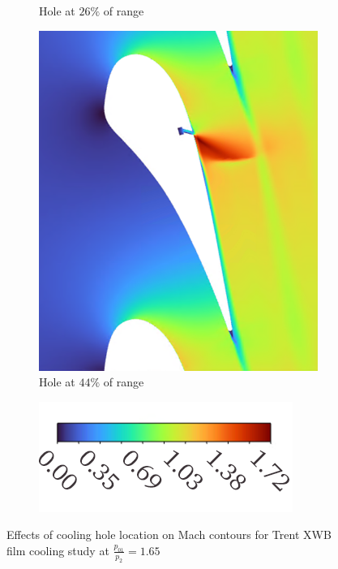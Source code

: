 \documentclass[a4paper, 11pt, oneside]{report}
\begin{document}
\begin{figure}[H]
\begin{subfigure}{.42\textwidth}
		\caption{Hole at $26\%$ of range}
	\end{subfigure}
	\hspace{0.05\textwidth}
	\begin{subfigure}{.42\textwidth}
		\centering
		\includegraphics[width=\linewidth]{figs/sch_mach_contours_3.png}
		\caption{Hole at $44\%$ of range}
	\end{subfigure}
	\begin{subfigure}{.4\textwidth}
		\centering
		\includegraphics[width=\linewidth]{figs/mach_legend_choked_horizontal.png}
	\end{subfigure}
	\caption{Effects of cooling hole location on Mach contours for Trent XWB film cooling study at $\frac{p_{01}}{p_2}=1.65$}
	\label{fig:sch_mach_0-3}
\end{figure}
\end{document}
